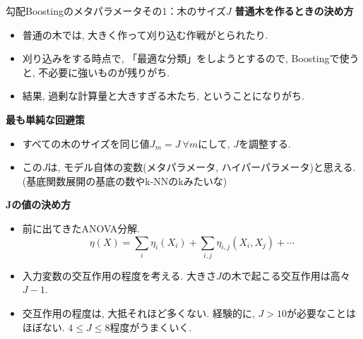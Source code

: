 \documentclass[dvipdfmx,8pt]{beamer}
\begin{document}
  \begin{frame}{勾配Boostingのメタパラメータその1：木のサイズ$J$}
    \textbf{普通木を作るときの決め方}
    \begin{itemize}
      \item 普通の木では, 大きく作って刈り込む作戦がとられたり.
      \item 刈り込みをする時点で, 「最適な分類」をしようとするので, Boostingで使うと, 不必要に強いものが残りがち.
      \item 結果, 過剰な計算量と大きすぎる木たち, ということになりがち.
    \end{itemize}
    \textbf{最も単純な回避策}
    \begin{itemize}
      \item すべての木のサイズを同じ値$J_m=J \ \forall m$にして, $J$を調整する.
      \item この$J$は, モデル自体の変数(メタパラメータ, ハイパーパラメータ)と思える.
      (基底関数展開の基底の数やk-NNのkみたいな)
    \end{itemize}
    \textbf{Jの値の決め方}
    \begin{itemize}
      \item 前に出てきたANOVA分解.
      \[
        \eta(X)=\sum_i\eta_i(X_i)+\sum_{i,j}\eta_{i,j}(X_i,X_j)+\cdots
      \]
      \item 入力変数の交互作用の程度を考える. 大きさ$J$の木で起こる交互作用は高々$J-1$.
      \item 交互作用の程度は, 大抵それほど多くない. 経験的に, $J>10$が必要なことはほぼない. $4 \le J \le 8$程度がうまくいく.
    \end{itemize}
  \end{frame}
\end{document}

